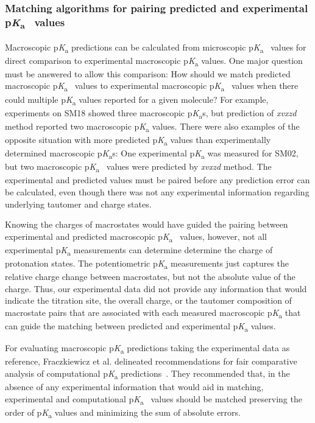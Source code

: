 \documentclass[9pt,lineno,final]{elife}
\newcommand{\pKa}{p\textit{K}\textsubscript{a}}
\begin{document}
\subsubsection{Matching algorithms for pairing predicted and experimental \pKa{}~ values}

Macroscopic \pKa{} predictions can be calculated from microscopic \pKa{}~ values for direct comparison to experimental macroscopic \pKa{} values.
One major question must be answered to allow this comparison:  
How should we match predicted macroscopic \pKa{}~ values to experimental macroscopic \pKa{}~ values when there could multiple \pKa{} values reported for a given molecule?
For example, experiments on SM18 showed three macroscopic \pKa{}s, but prediction of \textit{xvxzd} method reported two macroscopic \pKa{} values. 
There were also examples of the opposite situation with more predicted \pKa{} values than experimentally determined macroscopic \pKa{}s: One experimental \pKa{} was measured for SM02, but two macroscopic \pKa{}~ values were predicted by \textit{xvxzd} method.
The experimental and predicted values must be paired before any prediction error can be calculated, even though there was not any experimental information regarding underlying tautomer and charge states. 

Knowing the charges of macrostates would have guided the pairing between experimental and predicted macroscopic \pKa{}~ values, however, not all experimental \pKa{} measurements can determine determine the charge of protonation states. 
The potentiometric \pKa{} measurements just captures the relative charge change between macrostates, but not the absolute value of the charge.  
Thus, our experimental data did not provide any information that would indicate the titration site, the overall charge, or the tautomer composition of macrostate pairs that are associated with each measured macroscopic \pKa{} that can guide the matching between predicted and experimental \pKa{} values. 
 

For evaluating macroscopic \pKa{} predictions taking the experimental data as reference, Fraczkiewicz et al. delineated recommendations for fair comparative analysis of computational \pKa{} predictions~\citep{Fraczkiewicz:2013:ReferenceModuleinChemistryMolecularSciencesandChemicalEngineering}. 
They recommended that, in the absence of any experimental information that would aid in matching, experimental and computational \pKa{}~ values should be matched preserving the order of \pKa{} values and minimizing the sum of absolute errors.
\end{document}
